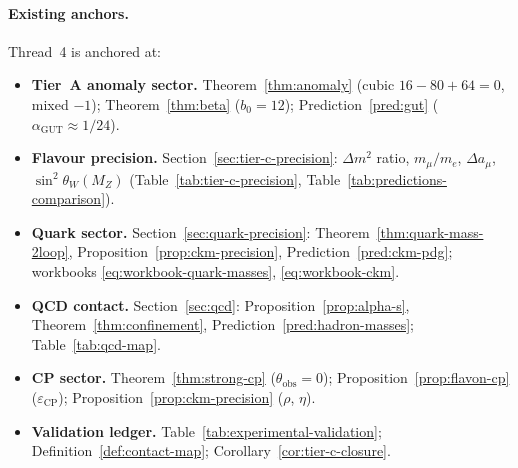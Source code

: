 \paragraph{Existing anchors.}
Thread~4 is anchored at:
\begin{itemize}[leftmargin=*]
  \item \textbf{Tier~A anomaly sector.}
    Theorem~\ref{thm:anomaly} (cubic $16-80+64=0$, mixed $-1$);
    Theorem~\ref{thm:beta} ($b_0=12$);
    Prediction~\ref{pred:gut} ($\alpha_{\mathrm{GUT}}\approx 1/24$).
  \item \textbf{Flavour precision.}
    Section~\ref{sec:tier-c-precision}: $\Delta m^2$ ratio, $m_\mu/m_e$,
    $\Delta a_\mu$, $\sin^2\theta_W(M_Z)$
    (Table~\ref{tab:tier-c-precision},
    Table~\ref{tab:predictions-comparison}).
  \item \textbf{Quark sector.}
    Section~\ref{sec:quark-precision}: Theorem~\ref{thm:quark-mass-2loop},
    Proposition~\ref{prop:ckm-precision}, Prediction~\ref{pred:ckm-pdg};
    workbooks \eqref{eq:workbook-quark-masses}, \eqref{eq:workbook-ckm}.
  \item \textbf{QCD contact.}
    Section~\ref{sec:qcd}: Proposition~\ref{prop:alpha-s},
    Theorem~\ref{thm:confinement}, Prediction~\ref{pred:hadron-masses};
    Table~\ref{tab:qcd-map}.
  \item \textbf{CP sector.}
    Theorem~\ref{thm:strong-cp} ($\theta_{\mathrm{obs}}=0$);
    Proposition~\ref{prop:flavon-cp} ($\varepsilon_{\mathrm{CP}}$);
    Proposition~\ref{prop:ckm-precision} ($\rho$, $\eta$).
  \item \textbf{Validation ledger.}
    Table~\ref{tab:experimental-validation};
    Definition~\ref{def:contact-map};
    Corollary~\ref{cor:tier-c-closure}.
\end{itemize}

